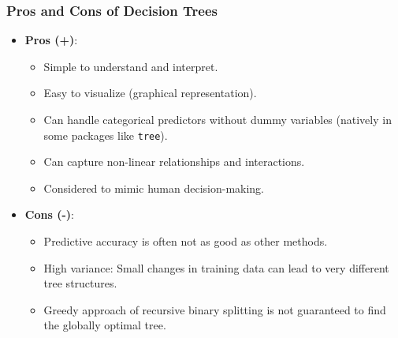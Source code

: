 \documentclass[12pt,a4paper]{article}
\newcommand{\Rpackage}[1]{\texttt{#1}} %
\begin{document}
\begin{itemize}
    \subsubsection{Pros and Cons of Decision Trees}
        \begin{itemize}
            \item \textbf{Pros (+)}:
                \begin{itemize}
                    \item Simple to understand and interpret.
                    \item Easy to visualize (graphical representation).
                    \item Can handle categorical predictors without dummy variables (natively in some packages like \Rpackage{tree}).
                    \item Can capture non-linear relationships and interactions.
                    \item Considered to mimic human decision-making.
                \end{itemize}
            \item \textbf{Cons (-)}:
                \begin{itemize}
                    \item Predictive accuracy is often not as good as other methods.
                    \item High variance: Small changes in training data can lead to very different tree structures.
                    \item Greedy approach of recursive binary splitting is not guaranteed to find the globally optimal tree.
                \end{itemize}
        \end{itemize}


\end{itemize}
\end{document}
